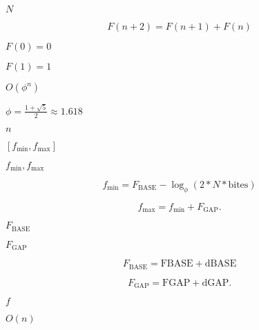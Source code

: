 \documentclass{article}
\begin{document}
$ N $
\pagebreak

\[ F(n+2) = F(n+1) + F(n) \]
\pagebreak

$F(0) = 0$
\pagebreak

$F(1)=1$
\pagebreak

$ O( \phi^n )$
\pagebreak

$\phi=\frac{1+\sqrt{5}}{2}\approx 1.618$
\pagebreak

$n$
\pagebreak

$ [f_\text{min}, f_\text{max}] $
\pagebreak

$f_\text{min}, f_\text{max}$
\pagebreak

\[ f_\text{min} = F_\text{BASE} - \log_\phi( 2*N*\text{bites} ) \]
\pagebreak

\[ f_\text{max} = f_\text{min} + F_\text{GAP}. \]
\pagebreak

$F_\text{BASE}$
\pagebreak

$F_\text{GAP}$
\pagebreak

\[ F_\text{BASE} = \text{FBASE}+\text{dBASE} \]
\pagebreak

\[ F_\text{GAP} = \text{FGAP}+\text{dGAP}. \]
\pagebreak

$f$
\pagebreak

$ O(n) $
\pagebreak
\end{document}
